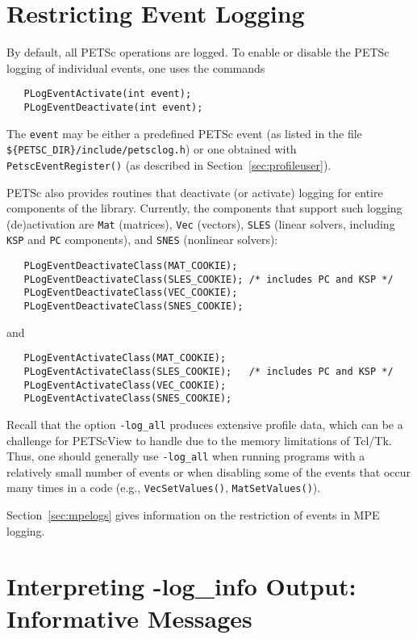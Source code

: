 {%
\section{Restricting Event Logging}
\label{sec:deactivate}

By default, all PETSc operations are logged.
To enable or disable the PETSc logging of individual events, one uses the commands
\begin{verbatim}
   PLogEventActivate(int event);
   PLogEventDeactivate(int event);
\end{verbatim}
The {\tt event} may be either a predefined PETSc event (as listed in
the file {\tt \$\{PETSC\_DIR\}/include/petsclog.h}) or one obtained with
{\tt PetscEventRegister()} (as described in Section~\ref{sec:profileuser}).

PETSc also provides routines that deactivate (or activate)
logging for entire components of the library. Currently, the 
components that support such logging (de)activation are {\tt Mat} (matrices),
{\tt Vec} (vectors), {\tt SLES} (linear solvers, including {\tt KSP} 
and {\tt PC} components), and {\tt SNES} (nonlinear solvers):
\begin{verbatim}
   PLogEventDeactivateClass(MAT_COOKIE);
   PLogEventDeactivateClass(SLES_COOKIE); /* includes PC and KSP */
   PLogEventDeactivateClass(VEC_COOKIE);
   PLogEventDeactivateClass(SNES_COOKIE);
\end{verbatim}
and 
\begin{verbatim}
   PLogEventActivateClass(MAT_COOKIE);
   PLogEventActivateClass(SLES_COOKIE);   /* includes PC and KSP */
   PLogEventActivateClass(VEC_COOKIE);
   PLogEventActivateClass(SNES_COOKIE);
\end{verbatim}

Recall that the option {\tt -log\_all} produces extensive profile
data, which can be a challenge for PETScView to handle due to
the memory limitations of Tcl/Tk.  Thus, one should generally use
{\tt -log\_all} when running programs with a relatively small
number of events or when disabling some of the events that occur many
times in a code (e.g., {\tt VecSetValues()}, {\tt MatSetValues()}).

Section~\ref{sec:mpelogs} gives information on the restriction of events
in MPE logging.


\section{Interpreting -log\_info Output: Informative Messages}
\label{sec:ploginfo}

}
